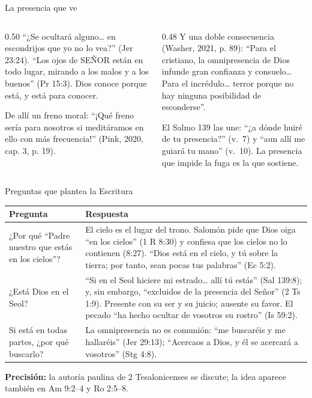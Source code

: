 \documentclass[hyperref={bookmarks=false},aspectratio=169]{beamer}
\newcommand{\SENOR}{S{\fontsize{0.78em}{1em}\selectfont EÑOR}}
\newcommand{\precision}[1]{{\footnotesize\color{gris}\textbf{Precisión:} #1}}
\begin{document}
\begin{frame}{La presencia que ve}
\begin{columns}[t,onlytextwidth]
\begin{column}{0.50\textwidth}\scriptsize
``¿Se ocultará alguno\ldots{} en escondrijos que yo no lo vea?'' (Jer 23:24). ``Los ojos de \SENOR{} están en todo lugar, mirando a los malos y a los buenos'' (Pr 15:3). Dios conoce porque está, y está para conocer.\par\medskip
De allí un freno moral: ``¡Qué freno sería para nosotros si meditáramos en ello con más frecuencia!'' (Pink, 2020, cap. 3, p. 19).
\end{column}
\begin{column}{0.48\textwidth}\scriptsize
Y una doble consecuencia (Washer, 2021, p. 89): ``Para el cristiano, la omnipresencia de Dios infunde gran confianza y consuelo\ldots{} Para el incrédulo\ldots{} terror porque no hay ninguna posibilidad de esconderse''.\par\medskip
El Salmo 139 las une: ``¿a dónde huiré de tu presencia?'' (v.~7) y ``aun allí me guiará tu mano'' (v.~10). La presencia que impide la fuga es la que sostiene.
\end{column}
\end{columns}
\end{frame}

\begin{frame}{Preguntas que plantea la Escritura}
\scriptsize\renewcommand{\arraystretch}{1.2}
\begin{tabular}{@{}>{\RaggedRight\arraybackslash}p{3.4cm}>{\RaggedRight\arraybackslash}p{8.4cm}@{}}
\toprule
\textbf{Pregunta} & \textbf{Respuesta} \\ \midrule
¿Por qué ``Padre nuestro que estás en los cielos''? & El cielo es el lugar del trono. Salomón pide que Dios oiga ``en los cielos'' (1 R 8:30) y confiesa que los cielos no lo contienen (8:27). ``Dios está en el cielo, y tú sobre la tierra; por tanto, sean pocas tus palabras'' (Ec 5:2). \\
¿Está Dios en el Seol? & ``Si en el Seol hiciere mi estrado\ldots{} allí tú estás'' (Sal 139:8); y, sin embargo, ``excluidos de la presencia del Señor'' (2 Ts 1:9). Presente con su ser y su juicio; ausente su favor. El pecado ``ha hecho ocultar de vosotros su rostro'' (Is 59:2). \\
Si está en todas partes, ¿por qué buscarlo? & La omnipresencia no es comunión: ``me buscaréis y me hallaréis'' (Jer 29:13); ``Acercaos a Dios, y él se acercará a vosotros'' (Stg 4:8). \\
\bottomrule
\end{tabular}\par\medskip
\precision{la autoría paulina de 2 Tesalonicenses se discute; la idea aparece también en Am 9:2--4 y Ro 2:5--8.}
\end{frame}
\end{document}
